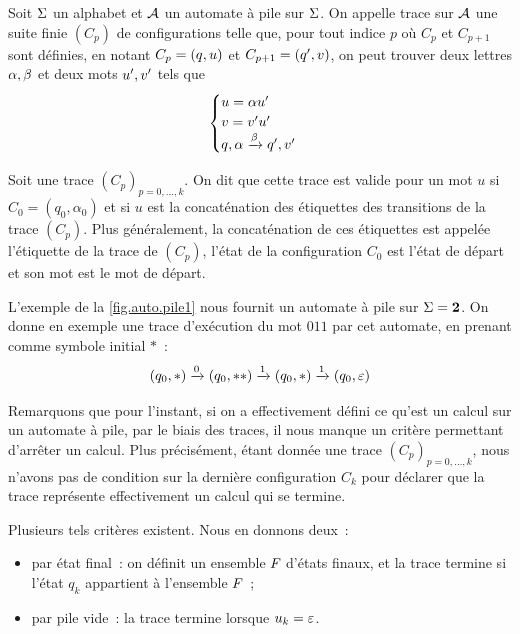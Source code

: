 \begin{definition}
  Soit $\Sigma$ un alphabet et $\mathcal{A}$ un automate à pile sur $\Sigma$.
  On appelle trace sur $\mathcal{A}$ une suite finie $(C_p)$ de
  configurations telle que, pour tout indice $p$ où $C_p$ et $C_{p+1}$ sont
  définies, en notant $C_p = (q_{},u)$ et $C_{p+1} = (q_{}',v)$, on
  peut trouver deux lettres $\alpha,\beta$ et deux mots $u',v'$ tels
  que
  \[\begin{cases}
  u = \alpha u'\\
  v = v'u'\\
  q_{},\alpha \xrightarrow{\beta} q_{}',v'
  \end{cases}\]
  
  Soit une trace $(C_p)_{p = 0,\ldots,k}$. On dit que cette trace est valide pour
  un mot $u$ si $C_0 = (q_0,\alpha_0)$ et si $u$ est la concaténation des
  étiquettes des transitions de la trace $(C_p)$. Plus généralement, la
  concaténation de ces étiquettes est appelée l'étiquette de la trace de
  $(C_p)$, l'état de la configuration $C_0$ est l'état de départ et son mot est
  le mot de départ.
\end{definition}

\begin{example}
  L'exemple de la \cref{fig.auto.pile1} nous fournit un automate à pile sur
  $\Sigma = \bm{2}$. On donne en exemple une trace d'exécution du mot $011$
  par cet automate, en prenant comme symbole initial $*$~:
  \[(q_{0},*) \xrightarrow{0} (q_{0},**) \xrightarrow{1} (q_{0},*)
  \xrightarrow{1} (q_{0},\varepsilon)\]
\end{example}

Remarquons que pour l'instant, si on a effectivement défini ce qu'est un calcul
sur un automate à pile, par le biais des traces, il nous manque un critère
permettant d'arrêter un calcul. Plus précisément, étant donnée une trace
$(C_p)_{p = 0,\ldots,k}$, nous n'avons pas de condition sur la dernière
configuration $C_k$ pour déclarer que la trace représente effectivement un
calcul qui se termine.

Plusieurs tels critères existent. Nous en donnons deux~:
\begin{itemize}
\item par état final~: on définit un ensemble $F_{}$ d'états finaux, et la
  trace termine si l'état $q_k$ appartient à l'ensemble $F_{}$~;
\item par pile vide~: la trace termine lorsque $u_k = \varepsilon$.
\end{itemize}


